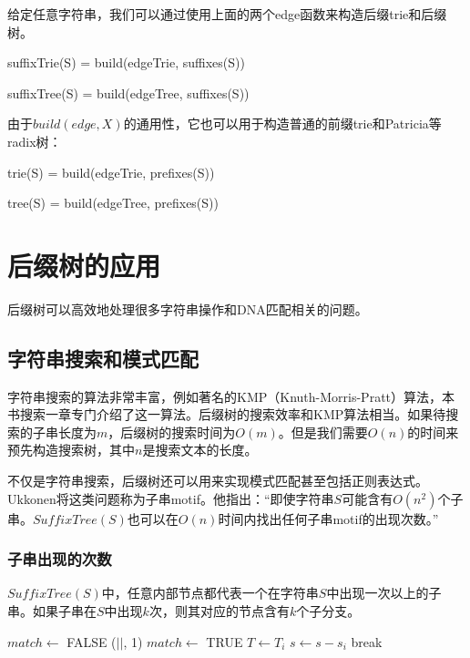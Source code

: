 \documentclass[UTF8]{article}
\begin{document}
给定任意字符串，我们可以通过使用上面的两个edge函数来构造后缀trie和后缀树。

\be
suffixTrie(S) = build(edgeTrie, suffixes(S))
\ee

\be
suffixTree(S) = build(edgeTree, suffixes(S))
\ee

由于$build(edge, X)$的通用性，它也可以用于构造普通的前缀trie和Patricia等radix树：

\be
trie(S) = build(edgeTrie, prefixes(S))
\ee

\be
tree(S) = build(edgeTree, prefixes(S))
\ee


\section{后缀树的应用}

后缀树可以高效地处理很多字符串操作和DNA匹配相关的问题。

\subsection{字符串搜索和模式匹配}
\label{substring-lookup}

字符串搜索的算法非常丰富，例如著名的KMP（Knuth-Morris-Pratt）算法，本书搜索一章专门介绍了这一算法。后缀树的搜索效率和KMP算法相当\cite{zhang-shaojie-lec}。如果待搜索的子串长度为$m$，后缀树的搜索时间为$O(m)$。但是我们需要$O(n)$的时间来预先构造搜索树，其中$n$是搜索文本的长度\cite{lallison-stree}。

不仅是字符串搜索，后缀树还可以用来实现模式匹配甚至包括正则表达式。Ukkonen将这类问题称为子串motif。他指出：“即使字符串$S$可能含有$O(n^2)$个子串。$SuffixTree(S)$也可以在$O(n)$时间内找出任何子串motif的出现次数。”

\subsubsection{子串出现的次数}

$SuffixTree(S)$中，任意内部节点都代表一个在字符串$S$中出现一次以上的子串。如果子串在$S$中出现$k$次，则其对应的节点含有$k$个子分支\cite{ukkonen-lec}。

\begin{algorithmic}[1]
  \Loop
    \State $match \gets$ FALSE
        \State \Return {}($|$$|$, 1)
        \State $match \gets$ TRUE
        \State $T \gets T_i$
        \State $s \gets s - s_i$
        \State break
      \EndIf
    \EndFor
      \State {}
    \EndIf
  \EndLoop
\EndFunction
\end{algorithmic}
\end{document}
